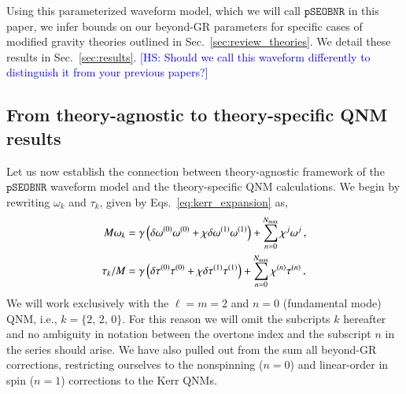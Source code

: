 \documentclass[twocolumn,
               prd,
               aps,
               superscriptaddress,
               tightenlines,
               nofootinbib,
               eqsecnum,
               amsfonts,
               amsmath,
               longbibliography]{revtex4-1}
\newcommand{\pSEOB}{\texttt{pSEOBNR}}
\newcommand{\hs}[1]{{\textcolor{blue}{{[HS: #1]}} }}
\begin{document}
Using this parameterized waveform model, which we will call $\pSEOB$ in this
paper, we infer bounds on our beyond-GR parameters for specific cases of
modified gravity theories outlined in Sec.~\ref{sec:review_theories}. We detail
these results in Sec.~\ref{sec:results}.
%
\hs{Should we call this waveform differently to distinguish it from your previous papers?}
%
%



\subsection{From theory-agnostic to theory-specific QNM results}
\label{sec:theory_specific_qnm}

Let us now establish the connection between theory-agnostic framework of the
$\pSEOB$ waveform model and the theory-specific QNM calculations.
%
We begin by rewriting $\omega_{k}$ and $\tau_{k}$, given by Eqs.~\eqref{eq:kerr_expansion} as,
%
\begin{subequations}
\label{eq:qnm_nongr_iso}
\begin{align}
M \omega_{k} &= \gamma \left( \delta\omega^{(0)} \omega^{(0)} + \chi \delta\omega^{(1)} \omega^{(1)} \right)
+ \sum_{n=0}^{N_{\rm max}} \chi^{j} \omega^{j}\,,
\\
\tau_{k}/M   &= \gamma \left( \delta\tau^{(0)} \tau^{(0)} + \chi \delta\tau^{(1)} \tau^{(1)} \right)
+ \sum_{n=0}^{N_{\rm max}} \chi^{(n)} \tau^{(n)}\,,
\end{align}
\end{subequations}
%
We will work exclusively with the $\ell = m = 2$ and $n = 0$ (fundamental mode)
QNM, i.e., $k = \{2,\, 2,\, 0\}$. For this reason we will omit the subcripts
$k$ hereafter and no ambiguity in notation between the overtone index and the
subscript $n$ in the series should arise.
%
We have also pulled out from the sum all beyond-GR corrections, restricting
ourselves to the nonspinning ($n=0$) and linear-order in spin ($n=1$)
corrections to the Kerr QNMs.
%
\end{document}
